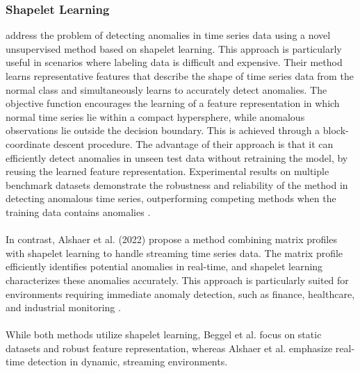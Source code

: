 \subsubsection{Shapelet Learning}
 address the problem of detecting anomalies in time series data using a novel unsupervised method based on shapelet learning. This approach is particularly useful in scenarios where labeling data is difficult and expensive.
Their method learns representative features that describe the shape of time series data from the normal class and simultaneously learns to accurately detect anomalies. The objective function encourages the learning of a feature representation in which normal time series lie within a compact hypersphere, while anomalous observations lie outside the decision boundary. This is achieved through a block-coordinate descent procedure.
The advantage of their approach is that it can efficiently detect anomalies in unseen test data without retraining the model, by reusing the learned feature representation. Experimental results on multiple benchmark datasets demonstrate the robustness and reliability of the method in detecting anomalous time series, outperforming competing methods when the training data contains anomalies \cite{beggel_time_2019}.\\\\
In contrast, Alshaer et al. (2022) propose a method combining matrix profiles with shapelet learning to handle streaming time series data. The matrix profile efficiently identifies potential anomalies in real-time, and shapelet learning characterizes these anomalies accurately. This approach is particularly suited for environments requiring immediate anomaly detection, such as finance, healthcare, and industrial monitoring \cite{alshaer_detecting_2020}.\\\\
While both methods utilize shapelet learning, Beggel et al. focus on static datasets and robust feature representation, whereas Alshaer et al. emphasize real-time detection in dynamic, streaming environments.
